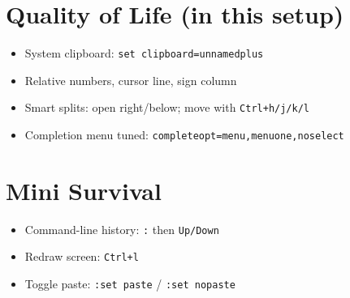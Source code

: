 \documentclass[9pt,twocolumn]{extarticle}
\newcommand{\key}[1]{\mbox{\texttt{#1}}}
\begin{document}
\section{Quality of Life (in this setup)}
\begin{itemize}
  \item System clipboard: \texttt{set clipboard=unnamedplus}
  \item Relative numbers, cursor line, sign column
  \item Smart splits: open right/below; move with \key{Ctrl+h/j/k/l}
  \item Completion menu tuned: \texttt{completeopt=menu,menuone,noselect}
\end{itemize}

\section{Mini Survival}
\begin{itemize}
  \item Command-line history: \key{:} then \key{Up/Down}
  \item Redraw screen: \key{Ctrl+l}
  \item Toggle paste: \key{:set paste} / \key{:set nopaste}
\end{itemize}
\end{document}
